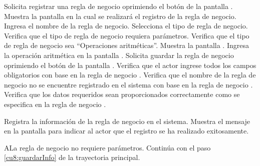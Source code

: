  \begin{UCtrayectoria}
    \UCpaso[\UCactor] Solicita registrar una regla de negocio oprimiendo el botón  de la pantalla .
    \UCpaso[\UCsist] Muestra la pantalla  en la cual se realizará el registro de la regla de negocio. 
    \UCpaso[\UCactor] Ingresa el nombre de la regla de negocio. \label{cu8.1:ingresaDatos}
    \UCpaso[\UCactor] Selecciona el tipo de regla de negocio. 
    \UCpaso[\UCsist] Verifica que el tipo de regla de negocio requiera parámetros. 
    \UCpaso[\UCsist] Verifica que el tipo de regla de negocio sea ``Operaciones aritméticas''. 
    \UCpaso[\UCsist] Muestra la pantalla .
    \UCpaso[\UCactor] Ingresa la operación aritmética en la pantalla .        \label{cu8:ingresaPaso}
    \UCpaso[\UCactor] Solicita guardar la regla de negocio oprimiendo el botón  de la pantalla .  \label{cu8:guardarInfo}
    \UCpaso[\UCsist] Verifica que el actor ingrese todos los campos obligatorios con base en la regla de negocio  . 
    \UCpaso[\UCsist] Verifica que el nombre de la regla de negocio no se encuentre registrado en el sistema con base en la regla de negocio  . 
    \UCpaso[\UCsist] Verifica que los datos requeridos sean proporcionados correctamente como se especifica en la regla de negocio . 
    
    \UCpaso[\UCsist] Registra la información de la regla de negocio en el sistema.
    \UCpaso[\UCsist] Muestra el mensaje  en la pantalla 
    para indicar al actor que el registro se ha realizado exitosamente.
 \end{UCtrayectoria}
 
 
 \begin{UCtrayectoriaA}{A}{La regla de negocio no requiere parámetros.}
	\UCpaso[] Continúa con el paso \ref{cu8:guardarInfo} de la trayectoria principal.
 \end{UCtrayectoriaA}
 

